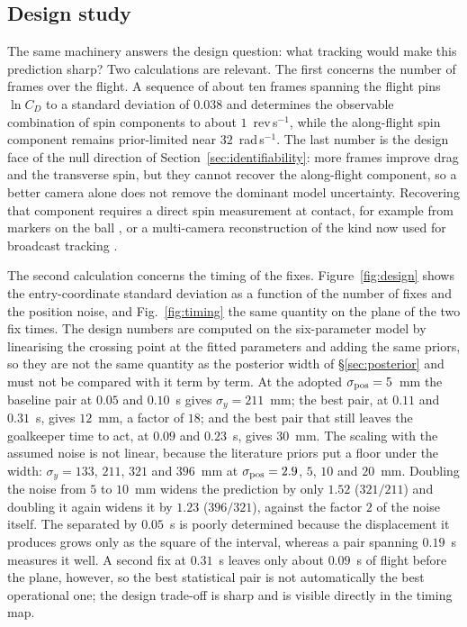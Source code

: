 \subsection{Design study}
\label{sec:design-study}

The same machinery answers the design question: what tracking would make this
prediction sharp? Two calculations are relevant. The first concerns the number of
frames over the flight. A sequence of about ten frames spanning the flight pins
$\ln C_D$ to a standard deviation of $0.038$ and determines the observable
combination of spin components to about $1$~rev\,s$^{-1}$, while the along-flight
spin component remains prior-limited near $32$~rad\,s$^{-1}$. The last number is
the design face of the null direction of Section~\ref{sec:identifiability}: more
frames improve drag and the transverse spin, but they cannot recover the
along-flight component, so a better camera alone does not remove the dominant
model uncertainty. Recovering that component requires a direct spin measurement
at contact, for example from markers on the ball \citep{shorter2013}, or a
multi-camera reconstruction of the kind now used for broadcast tracking
\citep{vorobev2025}.

The second calculation concerns the timing of the fixes. Figure~\ref{fig:design}
shows the entry-coordinate standard deviation as a function of the number of
fixes and the position noise, and Fig.~\ref{fig:timing} the same quantity on the
plane of the two fix times. The design numbers are computed on the six-parameter
model by linearising the crossing point at the fitted parameters and adding the
same priors, so they are not the same quantity as the posterior width of
\S\ref{sec:posterior} and must not be compared with it term by term. At the
adopted $\sigma_{\rm pos}=5$~mm the baseline pair at $0.05$ and $0.10$~s gives
$\sigma_y=211$~mm; the best pair, at $0.11$ and $0.31$~s, gives $12$~mm, a factor
of $18$; and the best pair that still leaves the goalkeeper time to act, at $0.09$
and $0.23$~s, gives $30$~mm. The scaling with the assumed noise is not linear,
because the literature priors put a floor under the width: $\sigma_y=133$, $211$,
$321$ and $396$~mm at $\sigma_{\rm pos}=2.9$, $5$, $10$ and $20$~mm. Doubling
the noise from $5$ to $10$~mm widens the prediction by only $1.52$ ($321/211$)
and doubling it again widens it by $1.23$ ($396/321$), against the factor $2$ of
the noise itself. The
separated by $0.05$~s is poorly determined because the displacement it produces
grows only as the square of the interval, whereas a pair spanning $0.19$~s
measures it well. A second fix at $0.31$~s leaves only about $0.09$~s of flight
before the plane, however, so the best statistical pair is not automatically the
best operational one; the design trade-off is sharp and is visible directly in
the timing map.

